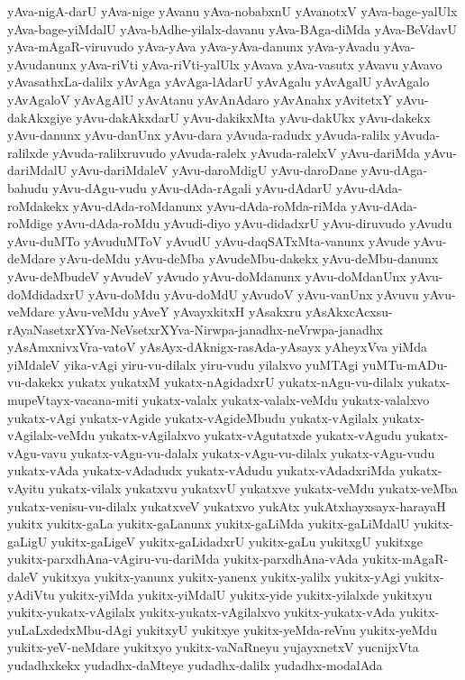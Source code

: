 {yAva-nigA-darU
yAva-nige
yAvanu
yAva-nobabxnU
yAvanotxV
yAva-bage-yalUlx
yAva-bage-yiMdalU
yAva-bAdhe-yilalx-davanu
yAva-BAga-diMda
yAva-BeVdavU
yAva-mAgaR-viruvudo
yAva-yAva
yAva-yAva-danunx
yAva-yAvadu
yAva-yAvudanunx
yAva-riVti
yAva-riVti-yalUlx
yAvava
yAva-vasutx
yAvavu
yAvavo
yAvasathxLa-dalilx
yAvAga
yAvAga-lAdarU
yAvAgalu
yAvAgalU
yAvAgalo
yAvAgaloV
yAvAgAlU
yAvAtanu
yAvAnAdaro
yAvAnahx
yAvitetxY
yAvu-dakAkxgiye
yAvu-dakAkxdarU
yAvu-dakikxMta
yAvu-dakUkx
yAvu-dakekx
yAvu-danunx
yAvu-danUnx
yAvu-dara
yAvuda-radudx
yAvuda-ralilx
yAvuda-ralilxde
yAvuda-ralilxruvudo
yAvuda-ralelx
yAvuda-ralelxV
yAvu-dariMda
yAvu-dariMdalU
yAvu-dariMdaleV
yAvu-daroMdigU
yAvu-daroDane
yAvu-dAga-bahudu
yAvu-dAgu-vudu
yAvu-dAda-rAgali
yAvu-dAdarU
yAvu-dAda-roMdakekx
yAvu-dAda-roMdanunx
yAvu-dAda-roMda-riMda
yAvu-dAda-roMdige
yAvu-dAda-roMdu
yAvudi-diyo
yAvu-didadxrU
yAvu-diruvudo
yAvudu
yAvu-duMTo
yAvuduMToV
yAvudU
yAvu-daqSATxMta-vanunx
yAvude
yAvu-deMdare
yAvu-deMdu
yAvu-deMba
yAvudeMbu-dakekx
yAvu-deMbu-danunx
yAvu-deMbudeV
yAvudeV
yAvudo
yAvu-doMdanunx
yAvu-doMdanUnx
yAvu-doMdidadxrU
yAvu-doMdu
yAvu-doMdU
yAvudoV
yAvu-vanUnx
yAvuvu
yAvu-veMdare
yAvu-veMdu
yAveY
yAvayxkitxH
yAsakxru
yAsAkxcAcxsu-rAyaNasetxrXYva-NeVsetxrXYva-Nirwpa-janadhx-neVrwpa-janadhx
yAsAmxnivxVra-vatoV
yAsAyx-dAknigx-rasAda-yAsayx
yAheyxVva
yiMda
yiMdaleV
yika-vAgi
yiru-vu-dilalx
yiru-vudu
yilalxvo
yuMTAgi
yuMTu-mADu-vu-dakekx
yukatx
yukatxM
yukatx-nAgidadxrU
yukatx-nAgu-vu-dilalx
yukatx-mupeVtayx-vacana-miti
yukatx-valalx
yukatx-valalx-veMdu
yukatx-valalxvo
yukatx-vAgi
yukatx-vAgide
yukatx-vAgideMbudu
yukatx-vAgilalx
yukatx-vAgilalx-veMdu
yukatx-vAgilalxvo
yukatx-vAgutatxde
yukatx-vAgudu
yukatx-vAgu-vavu
yukatx-vAgu-vu-dalalx
yukatx-vAgu-vu-dilalx
yukatx-vAgu-vudu
yukatx-vAda
yukatx-vAdadudx
yukatx-vAdudu
yukatx-vAdadxriMda
yukatx-vAyitu
yukatx-vilalx
yukatxvu
yukatxvU
yukatxve
yukatx-veMdu
yukatx-veMba
yukatx-venisu-vu-dilalx
yukatxveV
yukatxvo
yukAtx
yukAtxhayxsayx-harayaH
yukitx
yukitx-gaLa
yukitx-gaLanunx
yukitx-gaLiMda
yukitx-gaLiMdalU
yukitx-gaLigU
yukitx-gaLigeV
yukitx-gaLidadxrU
yukitx-gaLu
yukitxgU
yukitxge
yukitx-parxdhAna-vAgiru-vu-dariMda
yukitx-parxdhAna-vAda
yukitx-mAgaR-daleV
yukitxya
yukitx-yanunx
yukitx-yanenx
yukitx-yalilx
yukitx-yAgi
yukitx-yAdiVtu
yukitx-yiMda
yukitx-yiMdalU
yukitx-yide
yukitx-yilalxde
yukitxyu
yukitx-yukatx-vAgilalx
yukitx-yukatx-vAgilalxvo
yukitx-yukatx-vAda
yukitx-yuLaLxdedxMbu-dAgi
yukitxyU
yukitxye
yukitx-yeMda-reVnu
yukitx-yeMdu
yukitx-yeV-neMdare
yukitxyo
yukitx-vaNaRneyu
yujayxnetxV
yucnijxVta
yudadhxkekx
yudadhx-daMteye
yudadhx-dalilx
yudadhx-modalAda
}

